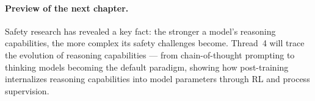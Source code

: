 \paragraph{Preview of the next chapter.}
Safety research has revealed a key fact: the stronger a model's reasoning capabilities, the more complex its safety challenges become.
Thread~4 will trace the evolution of reasoning capabilities ---
from chain-of-thought prompting to thinking models becoming the default paradigm,
showing how post-training internalizes reasoning capabilities into model parameters through RL and process supervision.
